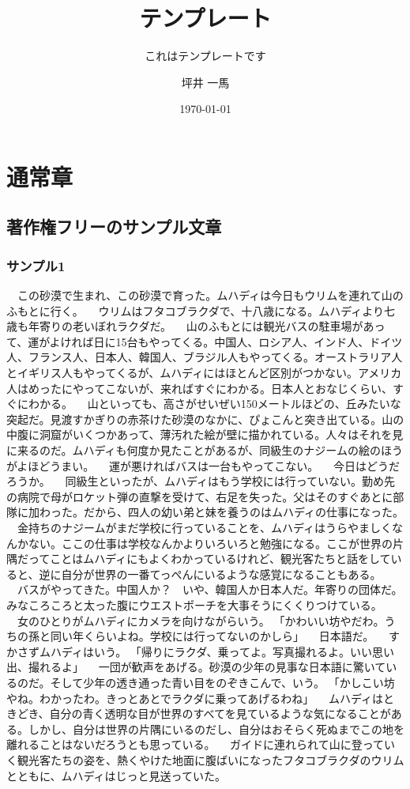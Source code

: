 \documentclass[11pt,a4paper,openright]{ltjsbook}
\title{テンプレート}
\subtitle{これはテンプレートです}
\author{坪井 一馬}
\date{\today}
\begin{document}
\maketitle

\tableofcontents

\chapter{通常章}

\section{著作権フリーのサンプル文章}

\subsection{サンプル1}

　この砂漠で生まれ、この砂漠で育った。ムハディは今日もウリムを連れて山のふもとに行く。
　ウリムはフタコブラクダで、十八歳になる。ムハディより七歳も年寄りの老いぼれラクダだ。
　山のふもとには観光バスの駐車場があって、運がよければ日に15台もやってくる。中国人、ロシア人、インド人、ドイツ人、フランス人、日本人、韓国人、ブラジル人もやってくる。オーストラリア人とイギリス人もやってくるが、ムハディにはほとんど区別がつかない。アメリカ人はめったにやってこないが、来ればすぐにわかる。日本人とおなじくらい、すぐにわかる。
　山といっても、高さがせいぜい150メートルほどの、丘みたいな突起だ。見渡すかぎりの赤茶けた砂漠のなかに、ぴょこんと突き出ている。山の中腹に洞窟がいくつかあって、薄汚れた絵が壁に描かれている。人々はそれを見に来るのだ。ムハディも何度か見たことがあるが、同級生のナジームの絵のほうがよほどうまい。
　運が悪ければバスは一台もやってこない。
　今日はどうだろうか。
　同級生といったが、ムハディはもう学校には行っていない。勤め先の病院で母がロケット弾の直撃を受けて、右足を失った。父はそのすぐあとに部隊に加わった。だから、四人の幼い弟と妹を養うのはムハディの仕事になった。
　金持ちのナジームがまだ学校に行っていることを、ムハディはうらやましくなんかない。ここの仕事は学校なんかよりいろいろと勉強になる。ここが世界の片隅だってことはムハディにもよくわかっているけれど、観光客たちと話をしていると、逆に自分が世界の一番てっぺんにいるような感覚になることもある。
　バスがやってきた。中国人か？　いや、韓国人か日本人だ。年寄りの団体だ。みなころころと太った腹にウエストポーチを大事そうにくくりつけている。
　女のひとりがムハディにカメラを向けながらいう。
「かわいい坊やだわ。うちの孫と同い年くらいよね。学校には行ってないのかしら」
　日本語だ。
　すかさずムハディはいう。
「帰りにラクダ、乗ってよ。写真撮れるよ。いい思い出、撮れるよ」
　一団が歓声をあげる。砂漠の少年の見事な日本語に驚いているのだ。そして少年の透き通った青い目をのぞきこんで、いう。
「かしこい坊やね。わかったわ。きっとあとでラクダに乗ってあげるわね」
　ムハディはときどき、自分の青く透明な目が世界のすべてを見ているような気になることがある。しかし、自分は世界の片隅にいるのだし、自分はおそらく死ぬまでこの地を離れることはないだろうとも思っている。
　ガイドに連れられて山に登っていく観光客たちの姿を、熱くやけた地面に腹ばいになったフタコブラクダのウリムとともに、ムハディはじっと見送っていた。
\end{document}
